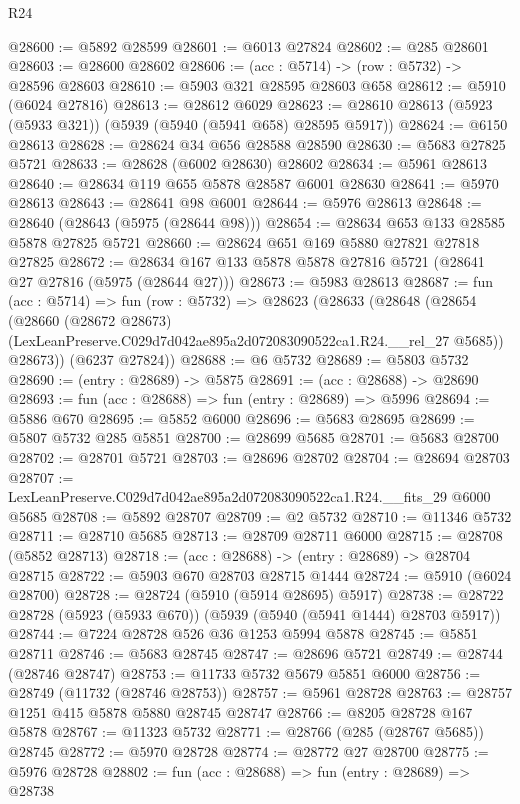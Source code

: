 \begin{lexlean}{R24}
\begin{coremodule}
@28600 := @5892 @28599
@28601 := @6013 @27824
@28602 := @285 @28601
@28603 := @28600 @28602
@28606 := (acc : @5714) -> (row : @5732) -> @28596 @28603
@28610 := @5903 @321 @28595 @28603 @658
@28612 := @5910 (@6024 @27816)
@28613 := @28612 @6029
@28623 := @28610 @28613 (@5923 (@5933 @321)) (@5939 (@5940 (@5941 @658) @28595 @5917))
@28624 := @6150 @28613
@28628 := @28624 @34 @656 @28588 @28590
@28630 := @5683 @27825 @5721
@28633 := @28628 (@6002 @28630) @28602
@28634 := @5961 @28613
@28640 := @28634 @119 @655 @5878 @28587 @6001 @28630
@28641 := @5970 @28613
@28643 := @28641 @98 @6001
@28644 := @5976 @28613
@28648 := @28640 (@28643 (@5975 (@28644 @98)))
@28654 := @28634 @653 @133 @28585 @5878 @27825 @5721
@28660 := @28624 @651 @169 @5880 @27821 @27818 @27825
@28672 := @28634 @167 @133 @5878 @5878 @27816 @5721 (@28641 @27 @27816 (@5975 (@28644 @27)))
@28673 := @5983 @28613
@28687 := fun (acc : @5714) =>
  fun (row : @5732) =>
  @28623
    (@28633
      (@28648
        (@28654
          (@28660
            (@28672 @28673)
            (LexLeanPreserve.C029d7d042ae895a2d072083090522ca1.R24.__rel_27 @5685))
          @28673))
      (@6237 @27824))
@28688 := @6 @5732
@28689 := @5803 @5732
@28690 := (entry : @28689) -> @5875
@28691 := (acc : @28688) -> @28690
@28693 := fun (acc : @28688) => fun (entry : @28689) => @5996
@28694 := @5886 @670
@28695 := @5852 @6000
@28696 := @5683 @28695
@28699 := @5807 @5732 @285 @5851
@28700 := @28699 @5685
@28701 := @5683 @28700
@28702 := @28701 @5721
@28703 := @28696 @28702
@28704 := @28694 @28703
@28707 := LexLeanPreserve.C029d7d042ae895a2d072083090522ca1.R24.__fits_29 @6000 @5685
@28708 := @5892 @28707
@28709 := @2 @5732
@28710 := @11346 @5732
@28711 := @28710 @5685
@28713 := @28709 @28711 @6000
@28715 := @28708 (@5852 @28713)
@28718 := (acc : @28688) -> (entry : @28689) -> @28704 @28715
@28722 := @5903 @670 @28703 @28715 @1444
@28724 := @5910 (@6024 @28700)
@28728 := @28724 (@5910 (@5914 @28695) @5917)
@28738 := @28722 @28728 (@5923 (@5933 @670)) (@5939 (@5940 (@5941 @1444) @28703 @5917))
@28744 := @7224 @28728 @526 @36 @1253 @5994 @5878
@28745 := @5851 @28711
@28746 := @5683 @28745
@28747 := @28696 @5721
@28749 := @28744 (@28746 @28747)
@28753 := @11733 @5732 @5679 @5851 @6000
@28756 := @28749 (@11732 (@28746 @28753))
@28757 := @5961 @28728
@28763 := @28757 @1251 @415 @5878 @5880 @28745 @28747
@28766 := @8205 @28728 @167 @5878
@28767 := @11323 @5732
@28771 := @28766 (@285 (@28767 @5685)) @28745
@28772 := @5970 @28728
@28774 := @28772 @27 @28700
@28775 := @5976 @28728
@28802 := fun (acc : @28688) =>
  fun (entry : @28689) =>
  @28738

\end{coremodule}
\end{lexlean}
